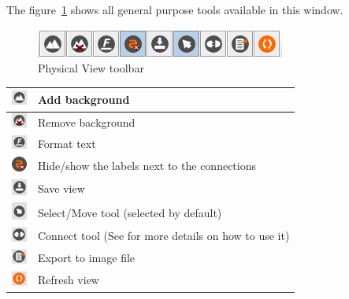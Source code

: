 \documentclass[a4paper]{article}
\begin{document}
		The figure~\ref{fig:default_view_toolbar} shows all general purpose tools available in this window.
		\begin{figure}[h!]
			\centering
			\includegraphics[width=0.6\linewidth]{img/default_view_toolbar.png}
			\caption{Physical View toolbar}
			\label{fig:default_view_toolbar}
		\end{figure}
		
		\begin{table}[h!]
			\centering
			\begin{tabular}[h!]{lp{10cm}}
				\includegraphics[width=0.5cm]{img/icon_add_background.png} & Add background\\
				\midrule
				\includegraphics[width=0.5cm]{img/icon_remove_background.png} & Remove background\\
				\midrule
				\includegraphics[width=0.5cm]{img/icon_format_text.png} & Format text\\
				\midrule
				\includegraphics[width=0.5cm]{img/icon_toggle_conn_labels.png} & Hide/show the labels next to the connections\\
				\midrule
				\includegraphics[width=0.5cm]{img/icon_save.png} & Save view\\
				\midrule
				\includegraphics[width=0.5cm]{img/icon_select_tool.png} & Select/Move tool (selected by default)\\
				\midrule
				\includegraphics[width=0.5cm]{img/icon_connect_tool.png} & Connect tool (See \textbf{\nameref{sec:physical_connections}} for more details on how to use it)\\
				\midrule
				\includegraphics[width=0.5cm]{img/icon_export.png} & Export to image file\\
				\midrule
				\includegraphics[width=0.5cm]{img/icon_refresh_view.png} & Refresh view\\
				
			\end{tabular}
		\end{table}
		
\end{document}
